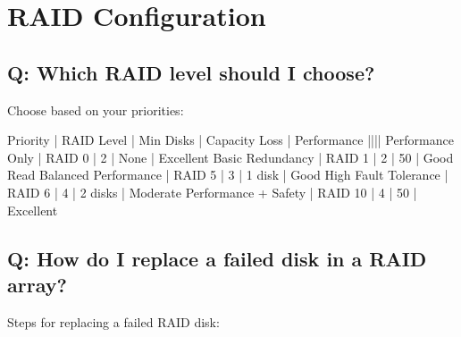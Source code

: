 \documentclass[letterpaper,10pt,english]{sphinxmanual}
\begin{document}
\section{RAID Configuration}
\label{\detokenize{faq:raid-configuration}}

\subsection{Q: Which RAID level should I choose?}
\label{\detokenize{faq:q-which-raid-level-should-i-choose}}
\sphinxAtStartPar
{} Choose based on your priorities:

\begin{sphinxVerbatim}[commandchars=\\\{\}]
Priority              | RAID Level | Min Disks | Capacity Loss | Performance
\PYGZhy{}\PYGZhy{}\PYGZhy{}\PYGZhy{}\PYGZhy{}\PYGZhy{}\PYGZhy{}\PYGZhy{}\PYGZhy{}\PYGZhy{}\PYGZhy{}\PYGZhy{}\PYGZhy{}\PYGZhy{}\PYGZhy{}\PYGZhy{}\PYGZhy{}\PYGZhy{}\PYGZhy{}\PYGZhy{}\PYGZhy{}\PYGZhy{}|\PYGZhy{}\PYGZhy{}\PYGZhy{}\PYGZhy{}\PYGZhy{}\PYGZhy{}\PYGZhy{}\PYGZhy{}\PYGZhy{}\PYGZhy{}\PYGZhy{}\PYGZhy{}|\PYGZhy{}\PYGZhy{}\PYGZhy{}\PYGZhy{}\PYGZhy{}\PYGZhy{}\PYGZhy{}\PYGZhy{}\PYGZhy{}\PYGZhy{}\PYGZhy{}|\PYGZhy{}\PYGZhy{}\PYGZhy{}\PYGZhy{}\PYGZhy{}\PYGZhy{}\PYGZhy{}\PYGZhy{}\PYGZhy{}\PYGZhy{}\PYGZhy{}\PYGZhy{}\PYGZhy{}\PYGZhy{}\PYGZhy{}|\PYGZhy{}\PYGZhy{}\PYGZhy{}\PYGZhy{}\PYGZhy{}\PYGZhy{}\PYGZhy{}\PYGZhy{}\PYGZhy{}\PYGZhy{}\PYGZhy{}\PYGZhy{}\PYGZhy{}
Performance Only      | RAID 0     | 2         | None          | Excellent
Basic Redundancy      | RAID 1     | 2         | 50\PYGZpc{}           | Good Read
Balanced Performance  | RAID 5     | 3         | 1 disk        | Good
High Fault Tolerance  | RAID 6     | 4         | 2 disks       | Moderate
Performance + Safety  | RAID 10    | 4         | 50\PYGZpc{}           | Excellent
\end{sphinxVerbatim}


\subsection{Q: How do I replace a failed disk in a RAID array?}
\label{\detokenize{faq:q-how-do-i-replace-a-failed-disk-in-a-raid-array}}
\sphinxAtStartPar
{} Steps for replacing a failed RAID disk:
\end{document}
